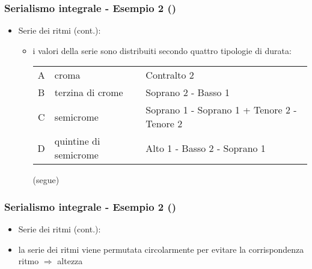\begin{frame}
    \frametitle{Serialismo integrale - Esempio 2 ()}

    \begin{itemize}

        \item Serie dei ritmi (cont.):

        \begin{itemize}

                \item i valori della serie sono distribuiti
                    secondo quattro tipologie di durata:

                    \begin{center}
                        \begin{tabular}{c p{} p{}}
                            A & croma & Contralto 2\\
                            B & terzina di crome & Soprano 2 - Basso 1\\
                            C & semicrome & Soprano 1 - Soprano 1 + Tenore 2 - Tenore 2\\
                            D & quintine di semicrome & Alto 1 - Basso 2 - Soprano 1\\
                        \end{tabular}
                    \end{center}

                    (segue)

         \end{itemize}

   \end{itemize}

\end{frame}

\begin{frame}
    \frametitle{Serialismo integrale - Esempio 2 ()}

    \begin{itemize}

        \item Serie dei ritmi (cont.):

              \begin{center}
                \end{center}

        \item la serie dei ritmi viene permutata circolarmente per
               evitare la corrispondenza ritmo $\Rightarrow$ altezza

   \end{itemize}

\end{frame}
